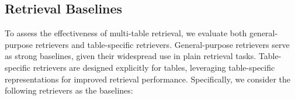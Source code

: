 


\subsection{Retrieval Baselines}
\label{apx:rtr_base}
To assess the effectiveness of multi-table retrieval, we evaluate both general-purpose retrievers and table-specific retrievers.
General-purpose retrievers serve as strong baselines, given their widespread use in plain retrieval tasks.
Table-specific retrievers are designed explicitly for tables, leveraging table-specific representations for improved retrieval performance.
Specifically, we consider the following retrievers as the baselines:
